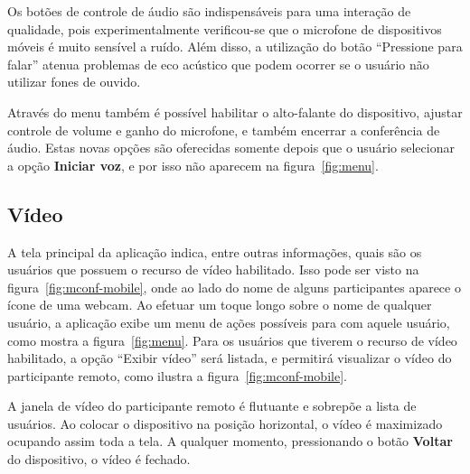 \documentclass{acm_proc_article-sp}
\begin{document}
Os botões de controle de áudio são indispensáveis para uma interação de qualidade, pois experimentalmente verificou-se que o microfone de dispositivos móveis é muito sensível a ruído. Além disso, a utilização do botão ``Pressione para falar'' atenua problemas de eco acústico que podem ocorrer se o usuário não utilizar fones de ouvido.

Através do menu também é possível habilitar o alto-falante do dispositivo, ajustar controle de volume e ganho do microfone, e também encerrar a conferência de áudio. Estas novas opções são oferecidas somente depois que o usuário selecionar a opção \textbf{Iniciar voz}, e por isso não aparecem na figura~\ref{fig:menu}.

\subsection{Vídeo}


A tela principal da aplicação indica, entre outras informações, quais são os usuários que possuem o recurso de vídeo habilitado. Isso pode ser visto na figura~\ref{fig:mconf-mobile}, onde ao lado do nome de alguns participantes aparece o ícone de uma webcam. Ao efetuar um toque longo sobre o nome de qualquer usuário, a aplicação exibe um menu de ações possíveis para com aquele usuário, como mostra a figura~\ref{fig:menu}. Para os usuários que tiverem o recurso de vídeo habilitado, a opção ``Exibir vídeo'' será listada, e permitirá visualizar o vídeo do participante remoto, como ilustra a figura~\ref{fig:mconf-mobile}. 


A janela de vídeo do participante remoto é flutuante e sobrepõe a lista de usuários. Ao colocar o dispositivo na posição horizontal, o vídeo é maximizado ocupando assim toda a tela. A qualquer momento, pressionando o botão \textbf{Voltar} do dispositivo, o vídeo é fechado.
\end{document}
